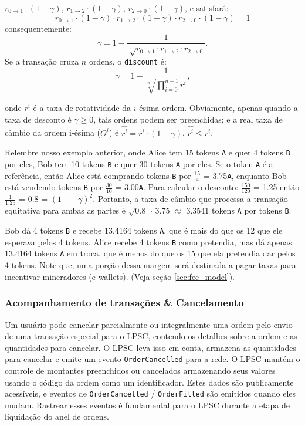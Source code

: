 \documentclass[UTF8,nofonts]{article}
\begin{document}
\begin{multicols}{2}
$r_{0\rightarrow 1} \cdot (1-\gamma)$, $r_{1\rightarrow 2} \cdot (1-\gamma)$, $r_{2 \rightarrow 0} \cdot (1-\gamma)$, e satisfará:
\begin{equation}
r_{0\rightarrow 1} \cdot (1-\gamma)\cdot r_{1\rightarrow 2} \cdot (1-\gamma) \cdot r_{2 \rightarrow 0} \cdot (1-\gamma) = 1
\end{equation}
consequentemente: 
\begin{equation}
\gamma = 1- \frac{1}{\sqrt[3]{r_{0\rightarrow 1} \cdot r_{1\rightarrow 2} \cdot r_{2\rightarrow 0}}}\text{.}
\end{equation}
Se a transação cruza $n$  ordens, o \texttt{discount} é: 
\begin{equation}
\gamma = 1- \frac{1}{\sqrt[n]{\prod_{i=0}^{n-1} r^i}} \text{,}
\end{equation}

onde $r^i$  é a taxa de rotatividade da $i$-ésima ordem. Obviamente, apenas quando a taxa de desconto é $\gamma \ge 0$, tais ordens podem ser preenchidas; e a real taxa de câmbio da ordem i-ésima ($O^i$) é $\hat{r^i} = r^i \cdot (1-\gamma)$, $\hat{r^i}\le r^i$.

Relembre nosso exemplo anterior, onde Alice tem 15 tokens \verb|A| e quer 4 tokens \verb|B| por eles, Bob tem 10 tokens \verb|B| e quer 30 tokens \verb|A| por eles. Se o token \verb|A| é a referência, então Alice está comprando tokens \verb|B| por $\frac{15}{4}$ = 3.75\verb|A|, enquanto Bob está vendendo tokens \verb|B| por $\frac{30}{10}$ = 3.00\verb|A|. Para calcular o desconto: $\frac{150}{120}$ = 1.25 então $\frac{1}{1.25}$ = 0.8 = $(1 −- \gamma)^2$. Portanto, a taxa de câmbio que processa a transação equitativa para ambas as partes é $\sqrt{0.8}$ $\cdot$ 3.75 $\approx$ 3.3541 tokens \verb|A| por tokens \verb|B|.

Bob dá 4 tokens \verb|B| e recebe 13.4164 tokens \verb|A|, que é mais do que os 12 que ele esperava pelos 4 tokens. Alice recebe 4 tokens \verb|B| como pretendia, mas dá apenas 13.4164 tokens \verb|A| em troca, que é menos do que os 15 que ela pretendia dar pelos 4 tokens.
Note que, uma porção dessa margem será destinada a pagar taxas para incentivar mineradores (e wallets). (Veja seção \ref{sec:fee_model}).

\subsubsection{Acompanhamento de transações \& Cancelamento}
Um usuário pode cancelar parcialmente ou integralmente uma ordem pelo envio de uma transação especial para o LPSC, contendo os detalhes sobre a ordem e as quantidades para cancelar. O LPSC leva isso em conta, armazena as quantidades para cancelar e emite um evento \verb|OrderCancelled| para a rede. O LPSC mantém o controle de montantes preenchidos ou cancelados armazenando seus valores usando o código da ordem como um identificador. Estes dados são publicamente acessíveis, e eventos de \verb|OrderCancelled| / \verb|OrderFilled| são emitidos quando eles mudam. Rastrear esses eventos é fundamental para o LPSC durante a etapa de liquidação do anel de ordens.


\end{multicols}
\end{document}
